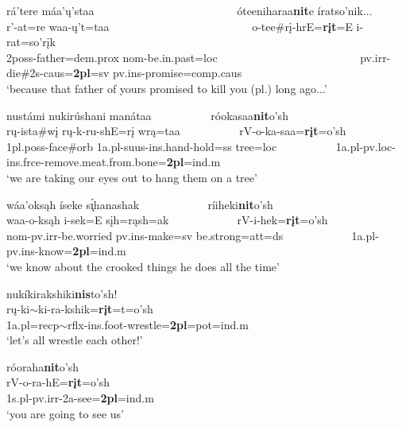 \begin{exe}
\begin{xlist}
	\item\label{2ndpersonplural4} 
	\glll rá'tere máa'ų'staa ~ ~ ~ ~ ~ ~ ~ ~ ~ ~ ~ ~ ~ ~ ~  óteeniharaa\textbf{nit}e íratso'nik...\\
	r'-at=re waa-ų't=taa ~ ~ ~ ~ ~ ~ ~ ~ ~ ~ ~ ~ ~ ~ ~  o-tee\#rį-hrE=\textbf{rįt}=E i-rat=so'rįk\\
	2poss-\textnormal{father}=dem.prox nom-\textnormal{be.in.past}=loc ~ ~ ~ ~ ~ ~ ~ ~ ~ ~ ~ ~ ~ ~ ~  pv.irr-\textnormal{die}\#2s-caus=\textbf{2pl}=sv pv.ins-\textnormal{promise}=comp.caus\\
	\glt `because that father of yours promised to kill you (pl.) long ago...' \citep[194]{hollow1973a}

	\item\label{2ndpersonplural5} 
	\glll nustámi nukirúshani manátaa ~ ~ ~ ~ ~ ~  róokasaa\textbf{nit}o'sh\\
	rų-ista\#wį rų-k-ru-shE=rį wrą=taa ~ ~ ~ ~ ~ ~  rV-o-ka-saa=\textbf{rįt}=o'sh\\
	1pl.poss-\textnormal{face}\#\textnormal{orb} 1a.pl-suus-ins.hand-\textnormal{hold}=ss \textnormal{tree}=loc ~ ~ ~ ~ ~ ~ 1a.pl-pv.loc-ins.frce-\textnormal{remove.meat.from.bone}=\textbf{2pl}=ind.m\\
	\glt `we are taking our eyes out to hang them on a tree' \citep[28]{hollow1973a}

	\item\label{2ndpersonplural6}
	\glll wáa'oksąh íseke s\'{ı̨}hanashak ~ ~ ~ ~ ~ ~ ~  ríiheki\textbf{nit}o'sh\\
	waa-o-ksąh i-sek=E sįh=rąsh=ak ~ ~ ~ ~ ~ ~ ~  rV-i-hek=\textbf{rįt}=o'sh\\
	nom-pv.irr-\textnormal{be.worried} pv.ins-\textnormal{make}=sv \textnormal{be.strong}=att=ds ~ ~ ~ ~ ~ ~ ~  1a.pl-pv.ins-\textnormal{know}=\textbf{2pl}=ind.m\\
	\glt `we know about the crooked things he does all the time' \citep[43]{hollow1973a}

	\item\label{2ndpersonplural7}
	\glll nukíkirakshiki\textbf{nis}to'sh!\\
	rų-ki$\sim$ki-ra-kshik=\textbf{rįt}=t=o'sh\\
	1a.pl=recp$\sim$rflx-ins.foot-\textnormal{wrestle}=\textbf{2pl}=pot=ind.m\\
	\glt `let's all wrestle each other!' \citep[152]{hollow1973b}

	\item\label{2ndpersonplural8}
	\glll róoraha\textbf{nit}o'sh\\
	rV-o-ra-hE=\textbf{rįt}=o'sh\\
	1s.pl-pv.irr-2a-\textnormal{see}=\textbf{2pl}=ind.m\\
	\glt `you are going to see us' \citep[477]{hollow1973a}
	
	\end{xlist}

\end{exe}


